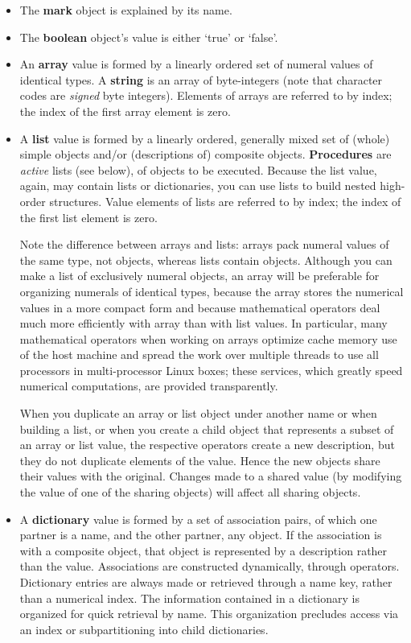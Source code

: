 \begin{itemize}
\item The \textbf{mark} object is explained by its name.

\item The \textbf{boolean} object's value is either `true' or `false'.

\item An \textbf{array} value is formed by a linearly ordered set of numeral values  of identical  types.  A \textbf{string} is an array of  byte-integers (note that character codes are \emph{signed} byte integers).  Elements  of arrays  are referred to by index;  the index of the  first  array element is zero. 

\item A  \textbf{list} value is formed by a linearly ordered,  generally mixed  set  of (whole)  simple  objects  and/or  (descriptions  of)  composite  objects. \textbf{Procedures} are \emph{active} lists (see below),  of objects  to  be  executed. Because the list value,  again,  may contain lists or  dictionaries,  you can use lists to build nested high-order structures.  Value elements of lists  are  referred to by index;  the index of  the  first  list element is zero.

Note  the  difference  between arrays and  lists:  arrays  pack  numeral values of the same type, not objects, whereas lists contain objects. Although you can make a  list of exclusively numeral  objects,  an  array  will  be preferable for organizing numerals of identical types,  because the array stores  the  numerical  values  in  a  more  compact  form  and   because mathematical  operators deal much more efficiently with array than  with  list values. In particular, many mathematical operators when working on arrays optimize cache memory use of the host machine and spread the work over multiple threads to use all processors in multi-processor Linux boxes; these services, which greatly speed numerical computations, are provided transparently.

When you duplicate an array or list object under another name or when building a list,  or when you create a  child object that represents a subset of an array or list value, the respective operators create a new description, but they do not duplicate elements of the  value.  Hence the new objects share their values with the  original. Changes made to a shared value (by modifying the value of one of the sharing objects) will affect all sharing objects.

\item A \textbf{dictionary} value is formed by a set of association pairs, of which one partner is a name,  and the other partner, any object. If the association is with a composite object,  that object is represented by a  description rather than the value.  Associations are constructed dynamically, through operators. Dictionary entries are always made or retrieved through a name key,  rather  than  a numerical index.  The information  contained  in  a dictionary is organized for quick retrieval by  name.  This organization precludes access via an index or subpartitioning into  child dictionaries.


\end{itemize}

